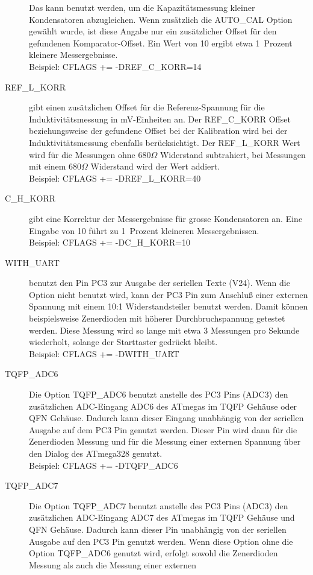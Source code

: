 \begin{description}
Das kann benutzt werden, um die Kapazitätsmessung kleiner Kondensatoren abzugleichen.
Wenn zusätzlich die AUTO\_CAL Option gewählt wurde, ist diese Angabe nur ein zusätzlicher Offset für
den gefundenen Komparator-Offset.
Ein Wert von 10 ergibt etwa 1~Prozent kleinere Messergebnisse.\\
Beispiel: CFLAGS += -DREF\_C\_KORR=14
  \item[REF\_L\_KORR] gibt einen zusätzlichen Offset für die Referenz-Spannung für die Induktivitätsmessung
in mV-Einheiten an. Der REF\_C\_KORR Offset beziehungsweise der gefundene Offset bei der Kalibration
wird bei der Induktivitätsmessung ebenfalls berücksichtigt.
Der REF\_L\_KORR Wert wird für die Messungen ohne \(680 \Omega\) Widerstand subtrahiert, bei Messungen mit einem
\(680 \Omega\) Widerstand wird der Wert addiert.\\
Beispiel: CFLAGS += -DREF\_L\_KORR=40
  \item[C\_H\_KORR] gibt eine Korrektur der Messergebnisse für grosse Kondensatoren an.
Eine Eingabe von 10 führt zu 1~Prozent kleineren Messergebnissen.\\
Beispiel: CFLAGS += -DC\_H\_KORR=10
  \item[WITH\_UART] benutzt den Pin PC3 zur Ausgabe der seriellen Texte (V24). Wenn die Option nicht
benutzt wird, kann der PC3 Pin zum Anschluß einer externen Spannung mit einem 10:1 Widerstandsteiler benutzt
werden. Damit können beispielsweise Zenerdioden mit höherer Durchbruchspannung getestet werden.
Diese Messung wird so lange mit etwa 3 Messungen pro Sekunde wiederholt, solange der Starttaster gedrückt bleibt.\\
Beispiel: CFLAGS += -DWITH\_UART
  \item[TQFP\_ADC6] Die Option TQFP\_ADC6 benutzt anstelle des PC3 Pins (ADC3) den zusätzlichen ADC-Eingang ADC6
des ATmegas im TQFP Gehäuse oder QFN Gehäuse.
Dadurch kann dieser Eingang unabhängig von der seriellen Ausgabe auf dem PC3 Pin genutzt werden. Dieser Pin wird
dann für die Zenerdioden Messung und für die Messung einer externen Spannung über den Dialog des ATmega328 genutzt.\\
Beispiel: CFLAGS += -DTQFP\_ADC6
  \item[TQFP\_ADC7] Die Option TQFP\_ADC7 benutzt anstelle des PC3 Pins (ADC3) den zusätzlichen ADC-Eingang ADC7
des ATmegas im TQFP Gehäuse und QFN Gehäuse.
Dadurch kann dieser Pin unabhängig von der seriellen Ausgabe auf den PC3 Pin genutzt werden. Wenn diese Option 
ohne die Option TQFP\_ADC6 genutzt wird, erfolgt sowohl die Zenerdioden Messung als auch die Messung einer externen

\end{description}
